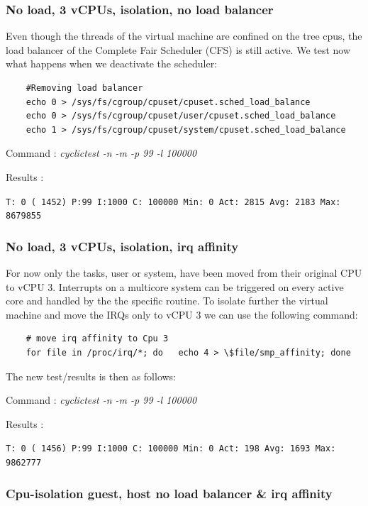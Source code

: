 \documentclass[]{scrartcl}
\begin{document}
\subsubsection{No load, 3 vCPUs, isolation, no load balancer}

Even though the threads of the virtual machine are confined on the tree cpus, the load balancer of the Complete Fair Scheduler (CFS) is still active. We test now what happens when we deactivate the scheduler:

\begin{verbatim}
	#Removing load balancer
	echo 0 > /sys/fs/cgroup/cpuset/cpuset.sched_load_balance
	echo 0 > /sys/fs/cgroup/cpuset/user/cpuset.sched_load_balance
	echo 1 > /sys/fs/cgroup/cpuset/system/cpuset.sched_load_balance
\end{verbatim}

\noindent Command : \textit{cyclictest -n -m -p 99 -l 100000}

\noindent Results :

\noindent  \texttt{T: 0 ( 1452) P:99 I:1000 C: 100000 Min:      0 Act: 2815 Avg: 2183 Max:  8679855}

\subsubsection{No load, 3 vCPUs, isolation, irq affinity}

For now only the tasks, user or system, have been moved from their original CPU to vCPU 3. Interrupts on a multicore system can be triggered on every active core and handled by the the specific routine. To isolate further the virtual machine and move the IRQs only to vCPU 3 we can use the following command: 

\begin{verbatim}
	# move irq affinity to Cpu 3
	for file in /proc/irq/*; do   echo 4 > \$file/smp_affinity; done
\end{verbatim}

The new test/results is then as follows:

\noindent Command : \textit{cyclictest -n -m -p 99 -l 100000}

\noindent Results :

\noindent \texttt{T: 0 ( 1456) P:99 I:1000 C: 100000 Min:      0 Act:  198 Avg: 1693 Max:  9862777}

\subsubsection{Cpu-isolation guest, host no load balancer \& irq affinity }
\end{document}
